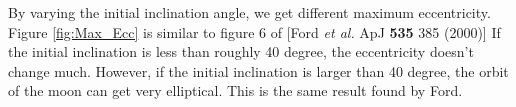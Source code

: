\documentclass[11pt,letterpaper]{article}
\begin{document}
By varying the initial inclination angle, we get different maximum eccentricity. Figure \ref{fig:Max_Ecc} is similar to figure 6 of [Ford \emph{et al.} ApJ \textbf{535} 385 (2000)] If the initial inclination is less than roughly 40 degree, the eccentricity doesn't change much. However, if the initial inclination is larger than 40 degree, the orbit of the moon can get very elliptical. This is the same result found by Ford.
\end{document}
